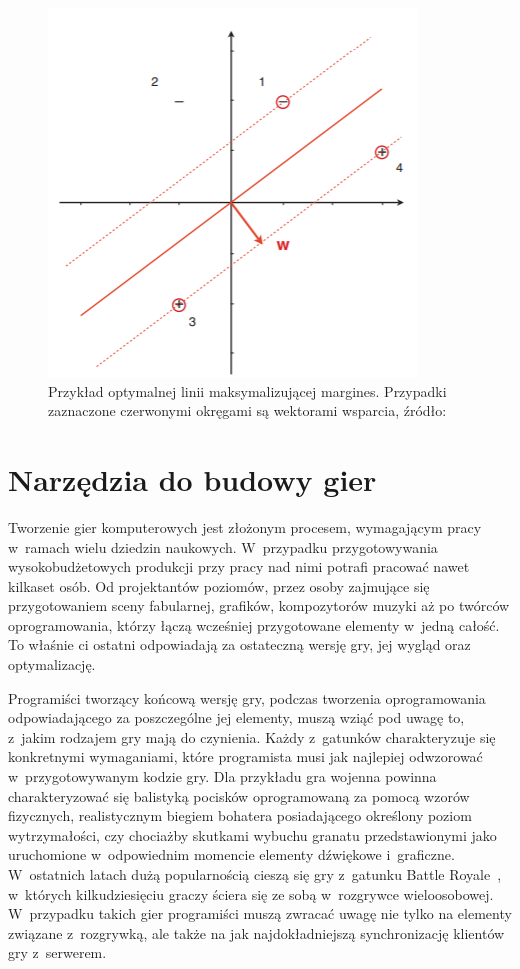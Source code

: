 \begin{figure}
	\centering
	\includegraphics[width=0.5\linewidth]{images/svm.png}
	\caption{Przykład optymalnej linii maksymalizującej margines. Przypadki zaznaczone czerwonymi okręgami są wektorami wsparcia, źródło:~\cite{flach_2012} }
	\label{fig:svm}
\end{figure}

\section{Narzędzia do budowy gier}
Tworzenie gier komputerowych jest złożonym procesem, wymagającym pracy w~ramach wielu dziedzin naukowych. W~przypadku przygotowywania wysokobudżetowych produkcji przy pracy nad nimi potrafi pracować nawet kilkaset osób. Od projektantów poziomów, przez osoby zajmujące się przygotowaniem sceny fabularnej, grafików, kompozytorów muzyki aż po twórców oprogramowania, którzy łączą wcześniej przygotowane elementy w~jedną całość. To właśnie ci ostatni odpowiadają za ostateczną wersję gry, jej wygląd oraz optymalizację. 

Programiści tworzący końcową wersję gry, podczas tworzenia oprogramowania odpowiadającego za poszczególne jej elementy, muszą wziąć pod uwagę to, z~jakim rodzajem gry mają do czynienia. Każdy z~gatunków charakteryzuje się konkretnymi wymaganiami, które programista musi jak najlepiej odwzorować w~przygotowywanym kodzie gry. Dla przykładu gra wojenna powinna charakteryzować się balistyką pocisków oprogramowaną za pomocą wzorów fizycznych, realistycznym biegiem bohatera posiadającego określony poziom wytrzymałości, czy chociażby skutkami wybuchu granatu przedstawionymi jako uruchomione w~odpowiednim momencie elementy dźwiękowe i~graficzne. W~ostatnich latach dużą popularnością cieszą się gry z~gatunku Battle Royale~\cite{network_traffic_moll}, w~których kilkudziesięciu graczy ściera się ze sobą w~rozgrywce wieloosobowej. W~przypadku takich gier programiści muszą zwracać uwagę nie tylko na elementy związane z~rozgrywką, ale także na jak najdokładniejszą synchronizację klientów gry z~serwerem.

